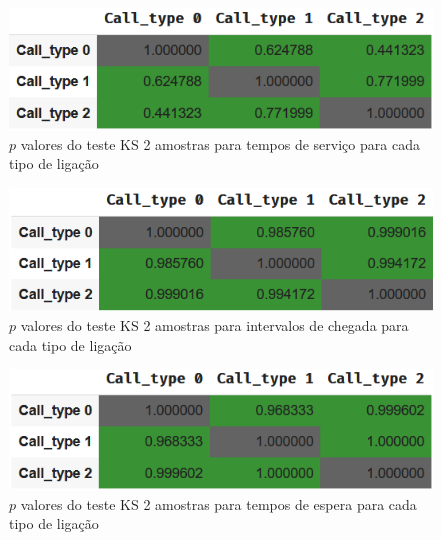 \begin{figure}[H]
    \centering
    \includegraphics{analise-de-dados/anual/ks-tipos-service.png}
    \caption{$p$ valores do teste KS 2 amostras para tempos de serviço para cada tipo de ligação}
    \label{fig: KS_tipos_servico}
\end{figure}

\begin{figure}[H]
    \centering
    \includegraphics{analise-de-dados/anual/ks-tipos-chegadas.png}
    \caption{$p$ valores do teste KS 2 amostras para intervalos de chegada para cada tipo de ligação}
    \label{fig: KS_tipos_chegada}
\end{figure}

\begin{figure}[H]
    \centering
    \includegraphics{analise-de-dados/anual/ks-tipos-espera.png}
    \caption{$p$ valores do teste KS 2 amostras para tempos de espera para cada tipo de ligação}
    \label{fig: KS_tipos_espera}
\end{figure}
